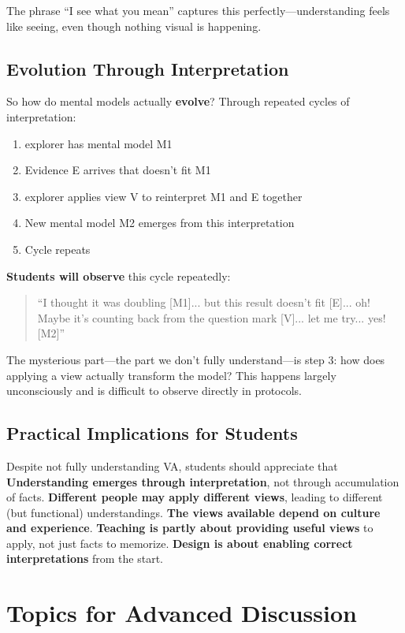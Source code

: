 \documentclass[12pt,letterpaper]{article}
\begin{document}
The phrase ``I see what you mean'' captures this perfectly—understanding feels like seeing, even though nothing visual is happening.

\subsection{Evolution Through Interpretation}

So how do mental models actually \textbf{evolve}? Through repeated cycles of interpretation:

\begin{enumerate}
\item explorer has mental model M1
\item Evidence E arrives that doesn't fit M1
\item explorer applies view V to reinterpret M1 and E together
\item New mental model M2 emerges from this interpretation
\item Cycle repeats
\end{enumerate}

\textbf{Students will observe} this cycle repeatedly:

\begin{quote}
``I thought it was doubling [M1]... but this result doesn't fit [E]... oh! Maybe it's counting back from the question mark [V]... let me try... yes! [M2]''
\end{quote}

The mysterious part—the part we don't fully understand—is step 3: how does applying a view actually transform the model? This happens largely unconsciously and is difficult to observe directly in protocols.

\subsection{Practical Implications for Students}

Despite not fully understanding VA, students should appreciate that \textbf{Understanding emerges through interpretation}, not through accumulation of facts. \textbf{Different people may apply different views}, leading to different (but functional) understandings. \textbf{The views available depend on culture and experience}. \textbf{Teaching is partly about providing useful views} to apply, not just facts to memorize. \textbf{Design is about enabling correct interpretations} from the start.

\section{Topics for Advanced Discussion}
\end{document}
